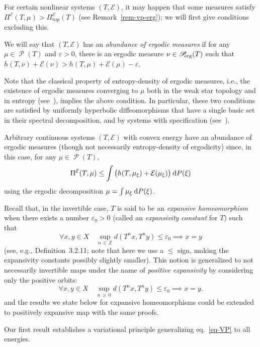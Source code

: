 \documentclass[AHL, Unicode, longabstracts,published]{cedram}
\theoremstyle{plain}
\theoremstyle{plain}
\newcommand\eps{\varepsilon}
\newcommand\NLP{\Pi}
\newcommand\Proberg{\Prob_{\kern-3pt\mathrm{erg}}}
\renewcommand\top{{\mathrm{top}}}
\newcommand\Prob{{\operatorname{\mathscr{P}}}}
\newcommand*{\dd} {\relax\ifnum\lastnodetype>0\mskip\medmuskip\fi\mathrm{d}}
\newcounter{In}
\newcommand*\8{\infty}
\newcommand\ZZ{\mathbb{Z}}
\newcommand{\En}{\mathcal{E}}
\let\oldforall\forall
\renewcommand*{\forall}{\mathrel{\oldforall}}
\begin{document}
For certain nonlinear systems $(T,\En)$, it may happen that some measures satisfy $\NLP^\En(T,\mu) > \NLP_\top^\En(T)$ (see Remark~\ref{rem-vp-erg}); we will first give conditions excluding this.

\begin{defi}
We will say that $(T,\En)$ has an \emph{abundance of ergodic measures} if for any $\mu\in\Prob(T)$ and $\eps>0$, there is an ergodic measure $\nu\in \Proberg(T)$ such that { $h(T,\nu)+\En(\nu)> h(T,\mu)+\En(\mu)-\eps$}.
\end{defi}


Note that the classical property of entropy-density of ergodic measures, i.e., the existence of ergodic measures converging to $\mu$ both in the weak star topology and in entropy (see~\cite[Lemma~3.2]{FollmerOrey1988}), implies the above condition. In particular, these two conditions are satisfied by uniformly hyperbolic diffeomorphisms that have a single basic set in their spectral decomposition, and by systems with specification (see~\cite{PfisterSullivan2007}).


Arbitrary continuous systems $(T,\En)$ with convex energy have an abundance of ergodic measures (though not necessarily entropy-density of ergodicity) since, in this case, for any $\mu\in\Prob(T)$,
\[
\NLP^\En(T,\mu) \le \int \big(h(T,\mu_\xi) + \En(\mu_\xi) \big) \dd P(\xi)
\]
using the ergodic decomposition $\mu=\int \mu_\xi \dd P(\xi)$.




Recall that, in the invertible case, $T$ is said to be an \emph{expansive homeomorphism} when there exists a number $\eps_0>0$ (called an \emph{expansivity constant} for $T$) such that
\[
\forall x,y\in X\quad \sup_{n\,\in\,\ZZ} d\left(T^nx,T^ny\right)\leq\eps_0 \implies x=y
\]
(see, e.g., \cite{Katok-Hasselblatt} Definition~3.2.11; note that here we use a $\le$ sign, making the expansivity constants possibly slightly smaller). This notion is generalized to not necessarily invertible maps under the name of \emph{positive expansivity} by considering only the positive orbits:
\[
\forall x,y\in X\quad \sup_{n\,\ge\,0} d\left(T^nx,T^ny\right)\leq\eps_0 \implies x=y.
\]
and the results we state below for expansive homeomorphisms could be extended to positively expansive map with the same proofs.

Our first result establishes a variational principle generalizing eq.~\eqref{eq-VP} to all energies.
\end{document}
